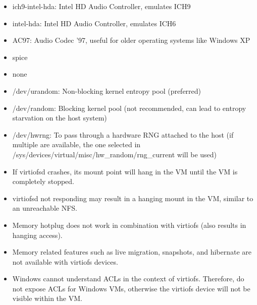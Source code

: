 \begin{itemize}[leftmargin=2cm]

	\item ich9-intel-hda: Intel HD Audio Controller, emulates ICH9

	\item intel-hda: Intel HD Audio Controller, emulates ICH6

	\item AC97: Audio Codec '97, useful for older operating systems like Windows XP

\end{itemize}

\begin{itemize}[leftmargin=2cm]

	\item spice

	\item none

\end{itemize}

\begin{itemize}[leftmargin=2cm]

	\item /dev/urandom: Non-blocking kernel entropy pool (preferred)

	\item /dev/random: Blocking kernel pool (not recommended, can lead to entropy starvation on the host system)

	\item /dev/hwrng: To pass through a hardware RNG attached to the host (if multiple are available, the one selected in /sys/devices/virtual/misc/hw_random/rng_current will be used)

\end{itemize}

\begin{itemize}[leftmargin=2cm]

	\item If virtiofsd crashes, its mount point will hang in the VM until the VM is completely stopped.

	\item virtiofsd not responding may result in a hanging mount in the VM, similar to an unreachable NFS.

	\item Memory hotplug does not work in combination with virtiofs (also results in hanging access).

	\item Memory related features such as live migration, snapshots, and hibernate are not available with virtiofs devices.

	\item Windows cannot understand ACLs in the context of virtiofs. Therefore, do not expose ACLs for Windows VMs, otherwise the virtiofs device will not be visible within the VM.

\end{itemize}


